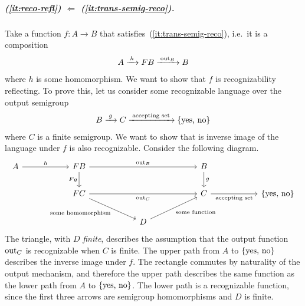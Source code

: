     
\subparagraph{
     (\ref{it:reco-refl}) $\Leftarrow$ (\ref{it:trans-semig-reco}).} Take a function $f : A \to B$ that satisfies~(\ref{it:trans-semig-reco}), i.e.~it is a composition 
\begin{align*}
    A \xrightarrow{\;h\;} \functor B \xrightarrow{\;\outfun_B\;} B
\end{align*}
where $h$ is some homomorphism.
We want to show that $f$ is recognizability reflecting. To prove this, let us consider some recognizable language over the output semigroup 
\begin{align*}
    B \xrightarrow{\;g\;} C \xrightarrow{\;\text{accepting set}\;} \{\text{yes, no}\}
\end{align*}
where $C$ is a finite semigroup.
We want to show that is inverse image of the language under $f$ is also recognizable. Consider the following diagram. 
\[\begin{tikzcd}
    [column sep=2cm]
	A & {\functor B} & & B \\
	& {\functor C} & & C & \set{\text{yes, no}}\\
    & & D
	\arrow["h", from=1-1, to=1-2]
	\arrow["\outfun_B", from=1-2, to=1-4]
	\arrow["{\functor g}"', from=1-2, to=2-2]
	\arrow["\outfun_C"', from=2-2, to=2-4]
	\arrow["g", from=1-4, to=2-4]
	\arrow["\text{accepting set}"', from=2-4, to=2-5]
    \arrow["\text{some homomorphism}"', from=2-2, to=3-3]
    \arrow["\text{some function}"', from=3-3, to=2-4]
\end{tikzcd}\]
The triangle, with $D$ \emph{finite}, describes  the assumption that the output function $\mathrm{out}_C$ is recognizable when $C$ is finite.
The upper path from $A$ to $\{\text{yes, no}\}$ describes the inverse image under $f$. 
 The  rectangle commutes by naturality of the output mechanism, and therefore the upper path describes the same function as the lower path from $A$ to $\{\text{yes, no}\}$. The lower path is a recognizable function, since the first three arrows are semigroup homomorphisms and $D$ is finite.
